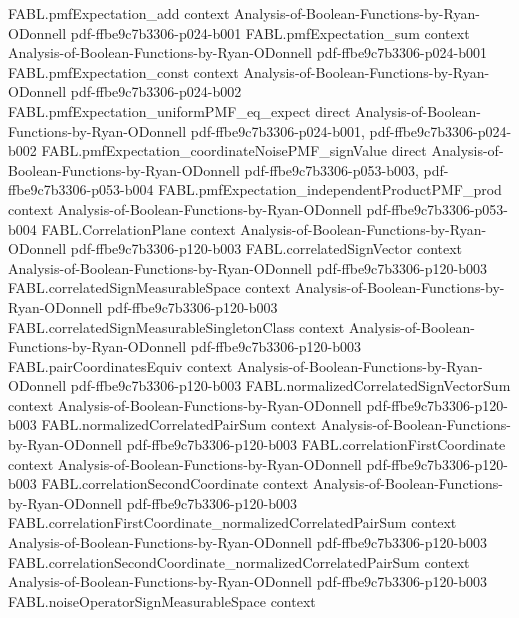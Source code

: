 \begin{theorem}
\proofstep
  {FABL.pmfExpectation_add}
  {context}
  {Analysis-of-Boolean-Functions-by-Ryan-ODonnell}
  {pdf-ffbe9c7b3306-p024-b001}
\proofstep
  {FABL.pmfExpectation_sum}
  {context}
  {Analysis-of-Boolean-Functions-by-Ryan-ODonnell}
  {pdf-ffbe9c7b3306-p024-b001}
\proofstep
  {FABL.pmfExpectation_const}
  {context}
  {Analysis-of-Boolean-Functions-by-Ryan-ODonnell}
  {pdf-ffbe9c7b3306-p024-b002}
\proofstep
  {FABL.pmfExpectation_uniformPMF_eq_expect}
  {direct}
  {Analysis-of-Boolean-Functions-by-Ryan-ODonnell}
  {pdf-ffbe9c7b3306-p024-b001,
    pdf-ffbe9c7b3306-p024-b002}
\proofstep
  {FABL.pmfExpectation_coordinateNoisePMF_signValue}
  {direct}
  {Analysis-of-Boolean-Functions-by-Ryan-ODonnell}
  {pdf-ffbe9c7b3306-p053-b003,
    pdf-ffbe9c7b3306-p053-b004}
\proofstep
  {FABL.pmfExpectation_independentProductPMF_prod}
  {context}
  {Analysis-of-Boolean-Functions-by-Ryan-ODonnell}
  {pdf-ffbe9c7b3306-p053-b004}
\proofstep
  {FABL.CorrelationPlane}
  {context}
  {Analysis-of-Boolean-Functions-by-Ryan-ODonnell}
  {pdf-ffbe9c7b3306-p120-b003}
\proofstep
  {FABL.correlatedSignVector}
  {context}
  {Analysis-of-Boolean-Functions-by-Ryan-ODonnell}
  {pdf-ffbe9c7b3306-p120-b003}
\proofstep
  {FABL.correlatedSignMeasurableSpace}
  {context}
  {Analysis-of-Boolean-Functions-by-Ryan-ODonnell}
  {pdf-ffbe9c7b3306-p120-b003}
\proofstep
  {FABL.correlatedSignMeasurableSingletonClass}
  {context}
  {Analysis-of-Boolean-Functions-by-Ryan-ODonnell}
  {pdf-ffbe9c7b3306-p120-b003}
\proofstep
  {FABL.pairCoordinatesEquiv}
  {context}
  {Analysis-of-Boolean-Functions-by-Ryan-ODonnell}
  {pdf-ffbe9c7b3306-p120-b003}
\proofstep
  {FABL.normalizedCorrelatedSignVectorSum}
  {context}
  {Analysis-of-Boolean-Functions-by-Ryan-ODonnell}
  {pdf-ffbe9c7b3306-p120-b003}
\proofstep
  {FABL.normalizedCorrelatedPairSum}
  {context}
  {Analysis-of-Boolean-Functions-by-Ryan-ODonnell}
  {pdf-ffbe9c7b3306-p120-b003}
\proofstep
  {FABL.correlationFirstCoordinate}
  {context}
  {Analysis-of-Boolean-Functions-by-Ryan-ODonnell}
  {pdf-ffbe9c7b3306-p120-b003}
\proofstep
  {FABL.correlationSecondCoordinate}
  {context}
  {Analysis-of-Boolean-Functions-by-Ryan-ODonnell}
  {pdf-ffbe9c7b3306-p120-b003}
\proofstep
  {FABL.correlationFirstCoordinate_normalizedCorrelatedPairSum}
  {context}
  {Analysis-of-Boolean-Functions-by-Ryan-ODonnell}
  {pdf-ffbe9c7b3306-p120-b003}
\proofstep
  {FABL.correlationSecondCoordinate_normalizedCorrelatedPairSum}
  {context}
  {Analysis-of-Boolean-Functions-by-Ryan-ODonnell}
  {pdf-ffbe9c7b3306-p120-b003}
\proofstep
  {FABL.noiseOperatorSignMeasurableSpace}
  {context}

\end{theorem}
